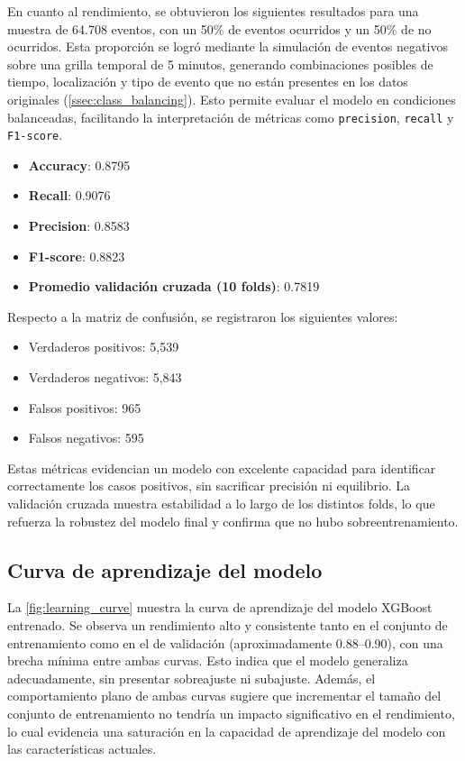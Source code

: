 \documentclass[12pt]{article}
\begin{document}
\noindent En cuanto al rendimiento, se obtuvieron los siguientes resultados para una muestra de 64.708 eventos, con un 50\% de eventos ocurridos y un 50\% de no ocurridos. Esta proporción se logró mediante la simulación de eventos negativos sobre una grilla temporal de 5 minutos, generando combinaciones posibles de tiempo, localización y tipo de evento que no están presentes en los datos originales (\autoref{ssec:class_balancing}). Esto permite evaluar el modelo en condiciones balanceadas, facilitando la interpretación de métricas como \texttt{precision}, \texttt{recall} y \texttt{F1-score}.

\begin{itemize}
    \item \textbf{Accuracy}: 0.8795
    \item \textbf{Recall}: 0.9076
    \item \textbf{Precision}: 0.8583
    \item \textbf{F1-score}: 0.8823
    \item \textbf{Promedio validación cruzada (10 folds)}: 0.7819
\end{itemize}

\noindent Respecto a la matriz de confusión, se registraron los siguientes valores:

\begin{itemize}
    \item Verdaderos positivos: 5,539
    \item Verdaderos negativos: 5,843
    \item Falsos positivos: 965
    \item Falsos negativos: 595
\end{itemize}

Estas métricas evidencian un modelo con excelente capacidad para identificar correctamente los casos positivos, sin sacrificar precisión ni equilibrio. La validación cruzada muestra estabilidad a lo largo de los distintos folds, lo que refuerza la robustez del modelo final y confirma que no hubo sobreentrenamiento.

\subsection{Curva de aprendizaje del modelo}

La \autoref{fig:learning_curve} muestra la curva de aprendizaje del modelo XGBoost entrenado. Se observa un rendimiento alto y consistente tanto en el conjunto de entrenamiento como en el de validación (aproximadamente 0.88–0.90), con una brecha mínima entre ambas curvas. Esto indica que el modelo generaliza adecuadamente, sin presentar sobreajuste ni subajuste. Además, el comportamiento plano de ambas curvas sugiere que incrementar el tamaño del conjunto de entrenamiento no tendría un impacto significativo en el rendimiento, lo cual evidencia una saturación en la capacidad de aprendizaje del modelo con las características actuales.
\end{document}
